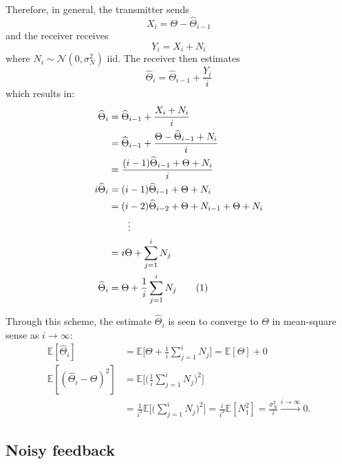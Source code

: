 \documentclass[letterpaper, 10pt, conference]{ieeeconf}
\newcommand\numberthis{\stepcounter{equation}\tag{\theequation}}
\begin{document}
Therefore, in general, the transmitter sends
\begin{equation}
	X_i = \Theta - \widehat\Theta_{i-1} \label{eq:tx-x-noiseless}
\end{equation}
and the receiver receives
\begin{equation}
	Y_i = X_i + N_i
\end{equation}
where $N_i \sim \mathcal{N}(0, \sigma_N^2)$ iid. The receiver then estimates
\begin{equation}
	\widehat\Theta_i = \widehat\Theta_{i-1} + \frac{Y_i}{i} \label{eq:rx-thetahat-noiseless}
\end{equation}
which results in:
\begin{align*}
	\widehat{\Theta}_{i}  &= \widehat{\Theta}_{i-1}+\frac{X_{i}+N_{i}}{i} \\
					  &= \widehat{\Theta}_{i-1}+\frac{\Theta-\widehat{\Theta}_{i-1}+N_{i}}{i} \\
					  &= \frac{(i-1)\widehat{\Theta}_{i-1}+\Theta+N_{i}}{i} \\
	i\widehat{\Theta}_{i} &= (i-1)\widehat{\Theta}_{i-1}+\Theta+N_{i} \\
					  &=(i-2)\widehat{\Theta}_{i-2}+\Theta+N_{i-1}+\Theta+N_{i} \\
					  & \qquad \vdots \\
					  &= i\Theta+\sum_{j=1}^{i}N_{j} \\
	\widehat{\Theta}_{i}  &=\Theta+\frac{1}{i}\sum_{j=1}^{i}N_{j} \numberthis \label{eq:theta_hat_i-noiseless}
\end{align*}

Through this scheme, the estimate $\widehat{\Theta}_{i}$ is seen to converge to $\Theta$ in mean-square sense as $i\rightarrow\infty$:
\begin{align*}
	\mathbb{E}[\widehat{\Theta}_{i}] &= \mathbb{E}\bigg[\Theta+\frac{1}{i}\sum_{j=1}^{i}N_{j}\bigg] = \mathbb{E}[\Theta]+0 \\
	\mathbb{E}[(\widehat{\Theta}_{i}-\Theta)^{2}] &= \mathbb{E}\bigg[\bigg(\frac{1}{i}\sum_{j=1}^{i}N_{j}\bigg)^{2}\bigg] \\
												  &= \frac{1}{i^{2}}\mathbb{E}\bigg[\bigg(\sum_{j=1}^{i}N_{j}\bigg)^{2}\bigg] = \frac{i}{i^{2}}\mathbb{E}[N_{1}^{2}] = \frac{\sigma_{N}^{2}}{i}\overset{i\to\infty}\longrightarrow 0.
\end{align*}


\subsection{Noisy feedback}
\label{sec:sk-noisy}
\end{document}
